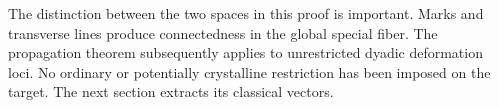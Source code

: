 The distinction between the two spaces in this proof
is important. Marks and transverse lines produce
connectedness in the global special fiber.
The propagation theorem subsequently applies to
unrestricted dyadic deformation loci.
No ordinary or potentially crystalline restriction
has been imposed on the target. The next section
extracts its classical vectors.
